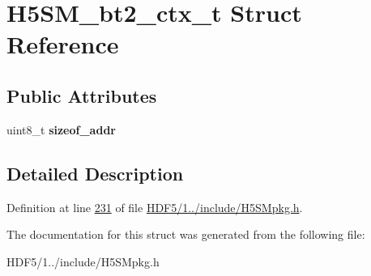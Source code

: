 \hypertarget{struct_h5_s_m__bt2__ctx__t}{}\section{H5\+S\+M\+\_\+bt2\+\_\+ctx\+\_\+t Struct Reference}
\label{struct_h5_s_m__bt2__ctx__t}
\subsection*{Public Attributes}
\begin{DoxyCompactItemize}
\item 
\mbox{\label{struct_h5_s_m__bt2__ctx__t_a3deefababcc7bbf2bbab15b0637ef056}} 
uint8\+\_\+t {\bfseries sizeof\+\_\+addr}
\end{DoxyCompactItemize}


\subsection{Detailed Description}


Definition at line \hyperlink{_h_d_f5_21_810_81_2include_2_h5_s_mpkg_8h_source_l00231}{231} of file \hyperlink{_h_d_f5_21_810_81_2include_2_h5_s_mpkg_8h_source}{H\+D\+F5/1../include/\+H5\+S\+Mpkg.\+h}.



The documentation for this struct was generated from the following file\+:\begin{DoxyCompactItemize}
\item 
H\+D\+F5/1../include/\+H5\+S\+Mpkg.\+h\end{DoxyCompactItemize}
